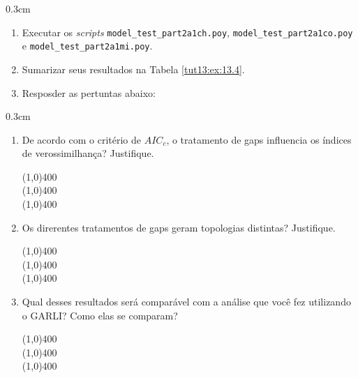 \begin{refsection}
\begin {myindentpar}{0.3cm}
\begin{enumerate}[\itshape 1.]


	\item{Executar os \textit{scripts} \texttt{model\_test\_part2a1ch.poy}, \texttt{model\_test\_part2a1co.poy} e \texttt{model\_test\_part2a1mi.poy}.}
	\item{Sumarizar seus resultados na Tabela \ref{tut13:ex:13.4}.}
	\item{Resposder as pertuntas abaixo:}

\end{enumerate}
\end{myindentpar}


\begin {myindentpar}{0.3cm}
\begin{enumerate}[\itshape 1.]

	\item{De acordo com o critério de $AIC_{c}$, o tratamento de gaps influencia os índices de verossimilhança? Justifique.}

\begin{center}
\line(1,0){400}\\
\line(1,0){400}\\
\line(1,0){400}\\
\end{center}

	\item{Os direrentes tratamentos de gaps geram topologias distintas? Justifique.}

\begin{center}
\line(1,0){400}\\
\line(1,0){400}\\
\line(1,0){400}\\
\end{center}

	\item{Qual desses resultados será comparável com a análise que você fez utilizando o GARLI? Como elas se comparam?}

\begin{center}
\line(1,0){400}\\
\line(1,0){400}\\
\line(1,0){400}\\
\end{center}


\end{enumerate}
\end{myindentpar}


\end{refsection}
